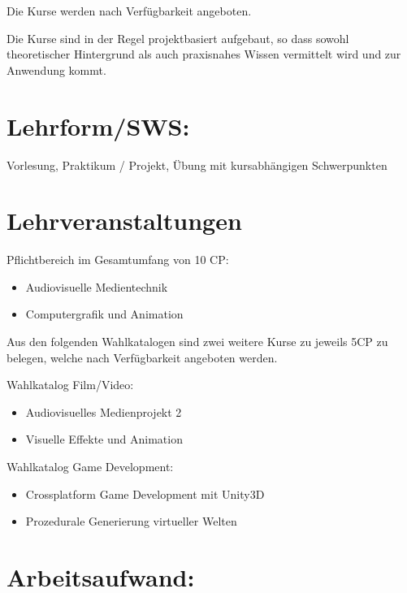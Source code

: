 Die Kurse werden nach Verfügbarkeit angeboten.

Die Kurse sind in der Regel projektbasiert aufgebaut, so dass sowohl
theoretischer Hintergrund als auch praxisnahes Wissen vermittelt wird
und zur Anwendung kommt.

\section*{Lehrform/SWS:}\label{lehrformsws-25}

Vorlesung, Praktikum / Projekt, Übung mit kursabhängigen Schwerpunkten

\section*{Lehrveranstaltungen}\label{lehrveranstaltungen}

Pflichtbereich im Gesamtumfang von 10 CP:

\begin{itemize}
\tightlist
\item
  Audiovisuelle Medientechnik
\item
  Computergrafik und Animation
\end{itemize}

Aus den folgenden Wahlkatalogen sind zwei weitere Kurse zu jeweils 5CP
zu belegen, welche nach Verfügbarkeit angeboten werden.

Wahlkatalog Film/Video:

\begin{itemize}
\tightlist
\item
  Audiovisuelles Medienprojekt 2
\item
  Visuelle Effekte und Animation
\end{itemize}

Wahlkatalog Game Development:

\begin{itemize}
\tightlist
\item
  Crossplatform Game Development mit Unity3D
\item
  Prozedurale Generierung virtueller Welten
\end{itemize}

\section*{Arbeitsaufwand:}\label{arbeitsaufwand-24}

